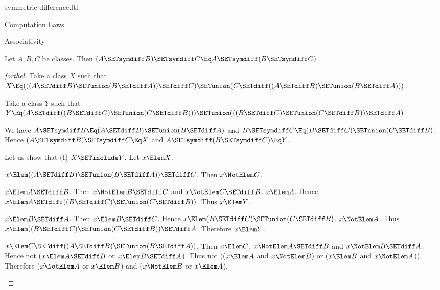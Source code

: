 \documentclass{stex}
\begin{document}
\begin{smodule}{symmetric-difference.ftl}
\begin{sfragment}{Computation Laws}
  \begin{sfragment}{Associativity}
    \begin{proposition}[forthel,id=FOUNDATIONS_03_8680845204258816]
      Let $A, B, C$ be classes.
      Then $(A \SETsymdiff B) \SETsymdiff C \Eq A \SETsymdiff (B \SETsymdiff C)$.
    \end{proposition}
    \begin{proof}[forthel]
      Take a class $X$ such that $X \Eq (((A \SETdiff B) \SETunion (B \SETdiff A)) \SETdiff C) \SETunion (C \SETdiff ((A \SETdiff B) \SETunion (B \SETdiff A)))$.

      Take a class $Y$ such that $Y \Eq (A \SETdiff ((B \SETdiff C) \SETunion (C \SETdiff B))) \SETunion (((B \SETdiff C) \SETunion (C \SETdiff B)) \SETdiff A)$.

      We have $A \SETsymdiff B \Eq (A \SETdiff B) \SETunion (B \SETdiff A)$ and $B \SETsymdiff C \Eq (B \SETdiff C) \SETunion (C \SETdiff B)$.
      Hence $(A \SETsymdiff B) \SETsymdiff C \Eq X$ and $A \SETsymdiff (B \SETsymdiff C) \Eq Y$.

      Let us show that (I) $X \SETinclude Y$.
        Let $x \Elem X$.

        \begin{case}{$x \Elem ((A \SETdiff B) \SETunion (B \SETdiff A)) \SETdiff C$.}
          Then $x \NotElem C$.

          \begin{case}{$x \Elem A \SETdiff B$.}
            Then $x \NotElem B \SETdiff C$ and $x \NotElem C \SETdiff B$. $x \Elem A$.
            Hence $x \Elem A \SETdiff ((B \SETdiff C) \SETunion (C \SETdiff B))$.
            Thus $x \Elem Y$.
          \end{case}

          \begin{case}{$x \Elem B \SETdiff A$.}
            Then $x \Elem B \SETdiff C$.
            Hence $x \Elem (B \SETdiff C) \SETunion (C \SETdiff B)$. $x \NotElem A$.
            Thus $x \Elem ((B \SETdiff C) \SETunion (C \SETdiff B)) \SETdiff A$.
            Therefore $x \Elem Y$.
          \end{case}
        \end{case}

        \begin{case}{$x \Elem C \SETdiff ((A \SETdiff B) \SETunion (B \SETdiff A))$.}
          Then $x \Elem C$.
          $x \NotElem A \SETdiff B$ and $x \NotElem B \SETdiff A$.
          Hence not ($x \Elem A \SETdiff B$ or $x \Elem B \SETdiff A$).
          Thus not (($x \Elem A$ and $x \NotElem B$) or ($x \Elem B$ and $x \NotElem A$)).
          Therefore ($x \NotElem A$ or $x \Elem B$) and ($x \NotElem B$ or $x \Elem A$).


\end{case}
\end{proof}
\end{sfragment}
\end{sfragment}
\end{smodule}
\end{document}
